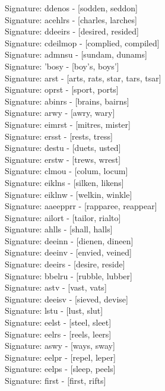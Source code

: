 Signature: {ddenos} - [sodden, seddon] \\
Signature: {acehlrs} - [charles, larches] \\
Signature: {ddeeirs} - [desired, resided] \\
Signature: {cdeilmop} - [complied, compiled] \\
Signature: {admnsu} - [sundam, dunams] \\
Signature: {'bosy} - [boy's, boys'] \\
Signature: {arst} - [arts, rats, star, tars, tsar] \\
Signature: {oprst} - [sport, ports] \\
Signature: {abinrs} - [brains, bairns] \\
Signature: {arwy} - [awry, wary] \\
Signature: {eimrst} - [mitres, mister] \\
Signature: {ersst} - [rests, tress] \\
Signature: {destu} - [duets, usted] \\
Signature: {erstw} - [trews, wrest] \\
Signature: {clmou} - [colum, locum] \\
Signature: {eiklns} - [silken, likens] \\
Signature: {eiklnw} - [welkin, winkle] \\
Signature: {aaeepprr} - [rapparee, reappear] \\
Signature: {ailort} - [tailor, rialto] \\
Signature: {ahlls} - [shall, halls] \\
Signature: {deeinn} - [dienen, dineen] \\
Signature: {deeinv} - [envied, veined] \\
Signature: {deeirs} - [desire, reside] \\
Signature: {bbelru} - [rubble, lubber] \\
Signature: {astv} - [vast, vats] \\
Signature: {deeisv} - [sieved, devise] \\
Signature: {lstu} - [lust, slut] \\
Signature: {eelst} - [steel, sleet] \\
Signature: {eelrs} - [reels, leers] \\
Signature: {aswy} - [ways, sway] \\
Signature: {eelpr} - [repel, leper] \\
Signature: {eelps} - [sleep, peels] \\
Signature: {first} - [first, rifts] \\
